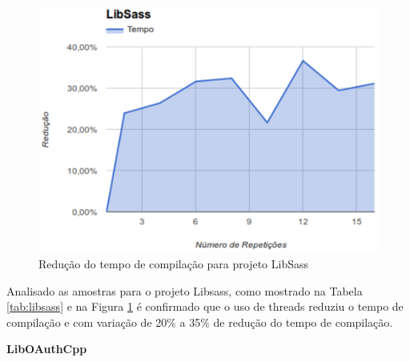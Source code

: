 \begin{figure}[h]
    \centering
        \includegraphics[keepaspectratio=true,scale=1]{figuras/libsass.eps}
    \caption{Redução do tempo de compilação para projeto LibSass}
    \label{libsass}
\end{figure}
Analisado as amostras para o projeto Libsass, como mostrado na Tabela \ref{tab:libsass} e na Figura \ref{libsass} é confirmado que o
 uso de threads reduziu o tempo de compilação e com variação
 de 20\% a 35\% de redução do tempo de compilação.

\textbf{LibOAuthCpp}

